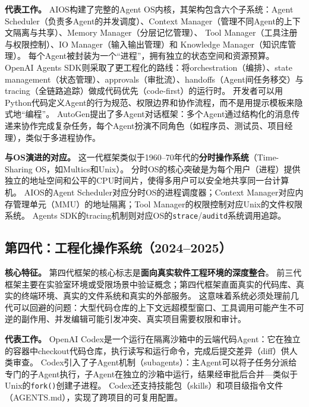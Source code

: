 \textbf{代表工作。}
AIOS\cite{mei2024aios}构建了完整的Agent OS内核，其架构包含六个子系统：Agent Scheduler（负责多Agent的并发调度）、Context Manager（管理不同Agent的上下文隔离与共享）、Memory Manager（分层记忆管理）、 Tool Manager（工具注册与权限控制）、IO Manager（输入输出管理）和 Knowledge Manager（知识库管理）。
每个Agent被封装为一个``进程''，拥有独立的状态空间和资源预算。
OpenAI Agents SDK\cite{openai_codex_agentsdk_2026}则采取了更工程化的路线：将orchestration（编排）、state management（状态管理）、approvals（审批流）、handoffs（Agent间任务移交）与tracing（全链路追踪）做成代码优先（code-first）的运行时。
开发者可以用Python代码定义Agent的行为规范、权限边界和协作流程，而不是用提示模板来隐式地``编程''。
AutoGen\cite{wu2023autogen}提出了多Agent对话框架：多个Agent通过结构化的消息传递来协作完成复杂任务，每个Agent扮演不同角色（如程序员、测试员、项目经理），类似于多进程协作。

\textbf{与OS演进的对应。}
这一代框架类似于1960--70年代的\textbf{分时操作系统}（Time-Sharing OS，如Multics和Unix）。
分时OS的核心突破是为每个用户（进程）提供独立的地址空间和公平的CPU时间片，使得多用户可以安全地共享同一台计算机。
AIOS的Agent Scheduler对应分时OS的进程调度器；Context Manager对应内存管理单元（MMU）的地址隔离；Tool Manager的权限控制对应Unix的文件权限系统。
Agents SDK的tracing机制则对应OS的\texttt{strace}/\texttt{auditd}系统调用追踪。

\subsection*{第四代：工程化操作系统（2024--2025）}

\textbf{核心特征。}
第四代框架的核心标志是\textbf{面向真实软件工程环境的深度整合}。
前三代框架主要在实验室环境或受限场景中验证概念；第四代框架直面真实的代码库、真实的终端环境、真实的文件系统和真实的外部服务。
这意味着系统必须处理前几代可以回避的问题：大型代码仓库的上下文远超模型窗口、工具调用可能产生不可逆的副作用、并发编辑可能引发冲突、真实项目需要权限和审计。

\textbf{代表工作。}
OpenAI Codex\cite{openai_codex_overview_2026}是一个运行在隔离沙箱中的云端代码Agent：它在独立的容器中checkout代码仓库，执行读写和运行命令，完成后提交差异（diff）供人类审查。
Codex引入了子Agent机制（subagents）\cite{openai_codex_subagents_2026}：主Agent可以将子任务分派给专门的子Agent执行，子Agent在独立的沙箱中运行，结果经审批后合并---类似于Unix的\texttt{fork()}创建子进程。
Codex还支持技能包（skills）\cite{openai_codex_skills_2026}和项目级指令文件（AGENTS.md）\cite{openai_codex_agents_md_2026}，实现了跨项目的可复用配置。

